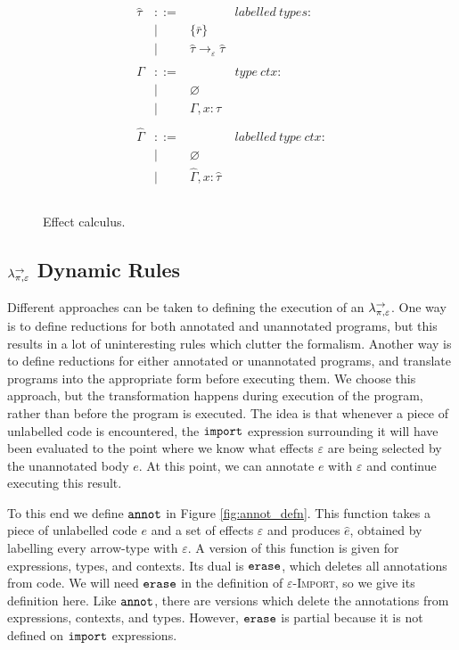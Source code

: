 \begin{figure}[h]
\[\begin{array}{lll}
\begin{array}{lllr}
\hat \tau & ::= & ~ & labelled ~types: \\
		& | & \{ \bar r \} \\
		& | & \hat \tau \rightarrow_{\varepsilon} \hat \tau \\
		&&\\

\Gamma & ::= & ~ & type~ctx: \\
				& | & \varnothing \\
				& | & \Gamma, x: \tau \\
				&&\\
				
\hat \Gamma & ::= & ~ & labelled~type~ctx:\\
				& | & \varnothing \\
				& | & \hat \Gamma, x: \hat \tau \\
				&&\\

\end{array}

\end{array}
\]

\vspace{-7pt}
\caption{Effect calculus.}
\label{This is the label.}
\end{figure}

\subsection{$\lambda^{\rightarrow}_{\pi, \varepsilon}$ Dynamic Rules}

Different approaches can be taken to defining the execution of an $\lambda^{\rightarrow}_{\pi, \varepsilon}$. One way is to define reductions for both annotated and unannotated programs, but this results in a lot of uninteresting rules which clutter the formalism. Another way is to define reductions for either annotated or unannotated programs, and translate programs into the appropriate form before executing them. We choose this approach, but the transformation happens during execution of the program, rather than before the program is executed. The idea is that whenever a piece of unlabelled code is encountered, the $\mathtt{import}$ expression surrounding it will have been evaluated to the point where we know what effects $\varepsilon$ are being selected by the unannotated body $e$. At this point, we can annotate $e$ with $\varepsilon$ and continue executing this result.

To this end we define $\mathtt{annot}$ in Figure \ref{fig:annot_defn}. This function takes a piece of unlabelled code $e$ and a set of effects $\varepsilon$ and produces $\hat e$, obtained by labelling every arrow-type with $\varepsilon$. A version of this function is given for expressions, types, and contexts. Its dual is $\mathtt{erase}$, which deletes all annotations from code. We will need $\mathtt{erase}$ in the definition of \textsc{$\varepsilon$-Import}, so we give its definition here. Like $\mathtt{annot}$, there are versions which delete the annotations from expressions, contexts, and types. However, $\mathtt{erase}$ is partial because it is not defined on $\mathtt{import}$ expressions.

